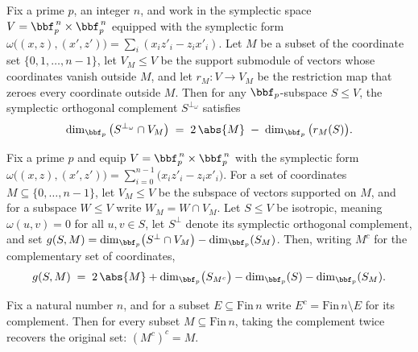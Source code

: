 \begin{lemma}
\label{dim_orth_inter}
\leanok
{}
Fix a prime $p$, an integer $n$, and work in the symplectic space $V = \bbf_p^{\,n}
\times \bbf_p^{\,n}$ equipped with the symplectic form $\omega\big((x,z),(x',z')\big) =
\sum_{i} (x_i z'_i - z_i x'_i)$. Let $M$ be a subset of the coordinate set
$\{0,1,\dots,n-1\}$, let $V_M \le V$ be the support submodule of vectors whose
coordinates vanish outside $M$, and let $r_M : V \to V_M$ be the restriction map that
zeroes every coordinate outside $M$. Then for any $\bbf_p$-subspace $S \le V$, the
symplectic orthogonal complement $S^{\perp_\omega}$ satisfies
\[
\dim_{\bbf_p}\big(S^{\perp_\omega} \cap V_M\big) \;=\; 2\,\abs{M} \;-\;
\dim_{\bbf_p}\big(r_M(S)\big).
\]
\end{lemma}

\begin{lemma}
\label{g_expansion}
\leanok
{}
Fix a prime $p$ and equip $V = \bbf_p^{\,n} \times \bbf_p^{\,n}$ with the symplectic
form $\omega\big((x,z),(x',z')\big) = \sum_{i=0}^{n-1}\big(x_i z'_i - z_i x'_i\big)$.
For a set of coordinates $M \subseteq \{0,\dots,n-1\}$, let $V_M \le V$ be the subspace
of vectors supported on $M$, and for a subspace $W \le V$ write $W_M = W \cap V_M$. Let
$S \le V$ be isotropic, meaning $\omega(u,v) = 0$ for all $u,v \in S$, let $S^{\perp}$
denote its symplectic orthogonal complement, and set $g(S,M) =
\dim_{\bbf_p}\!\big(S^{\perp}\cap V_M\big) - \dim_{\bbf_p}(S_M)$. Then, writing $M^c$
for the complementary set of coordinates,
\[
g(S,M) \;=\; 2\,\abs{M} + \dim_{\bbf_p}\!\big(S_{M^c}\big) - \dim_{\bbf_p}(S) -
\dim_{\bbf_p}(S_M).
\]
\end{lemma}

\begin{lemma}
\label{E_c_E_c}
\leanok
{}
Fix a natural number $n$, and for a subset $E \subseteq \mathrm{Fin}\,n$ write $E^c =
\mathrm{Fin}\,n \setminus E$ for its complement. Then for every subset $M \subseteq
\mathrm{Fin}\,n$, taking the complement twice recovers the original set: $(M^c)^c = M$.
\end{lemma}

